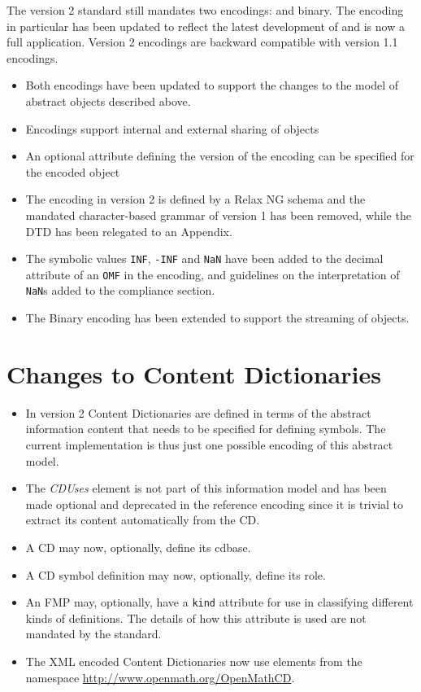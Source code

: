 \begin{appendix}
The \OM version 2 standard still mandates two encodings: \XML and binary. The \XML
encoding in particular has been updated to reflect the latest development of \XML and is
now a full \XML application.  Version 2 encodings are backward compatible with version 1.1
encodings.
\begin{itemize}
\item Both encodings have been updated to support the changes to the model of abstract
  objects described above.
\item Encodings support internal and external sharing of objects
\item An optional attribute defining the version of the encoding can be specified for the
  encoded object
\item The \XML encoding in version 2 is defined by a Relax NG schema and the mandated
  character-based grammar of version 1 has been removed, while the DTD has been relegated
  to an Appendix.
\item The symbolic values \lstinline|INF|, \lstinline|-INF| and \lstinline|NaN| have
  been added to the decimal attribute of an \lstinline|OMF| in the \XML encoding, and
  guidelines on the interpretation of \lstinline|NaN|s added to the compliance section.
\item The Binary encoding has been extended to support the streaming of objects.
\end{itemize}
    
\section{Changes to Content Dictionaries}\label{chgcd}
    
\begin{itemize}
\item In \OM version 2 Content Dictionaries are defined in terms of the abstract
  information content that needs to be specified for defining \OM symbols. The current
  implementation is thus just one possible encoding of this abstract model.
\item The \emph{CDUses} element is not part of this information model and has been made
  optional and deprecated in the reference encoding since it is trivial to extract its
  content automatically from the CD.
\item A CD may now, optionally, define its cdbase.
\item A CD symbol definition may now, optionally, define its role.
\item An FMP may, optionally, have a \lstinline|kind| attribute for use in classifying
  different kinds of definitions.  The details of how this attribute is used are not
  mandated by the standard.
\item The XML encoded Content Dictionaries now use elements from the namespace
  \url{http://www.openmath.org/OpenMathCD}.
\end{itemize}
\end{appendix}

